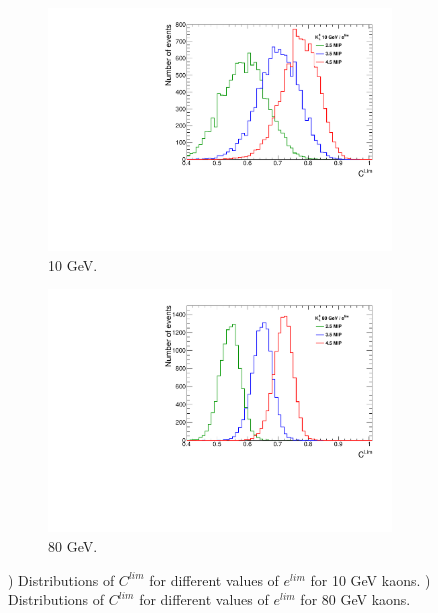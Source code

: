 \begin{figure}[htbp!]
  \centering
  \begin{subfigure}[t]{0.45\textwidth}
    \centering
    \includegraphics[width=1\linewidth]{../Thesis_Plots/ILD/AdditionalPlots/Plots/CLim_100ns_10GeV.pdf}
    \caption{10 GeV.} \label{fig:CLim10_100ns}
  \end{subfigure}
  \hfill
  \begin{subfigure}[t]{0.45\textwidth}
    \centering
    \includegraphics[width=1\linewidth]{../Thesis_Plots/ILD/AdditionalPlots/Plots/CLim_100ns_80GeV.pdf}
    \caption{80 GeV.} \label{fig:CLim80_100ns}
  \end{subfigure}
  \caption{) Distributions of $C^{lim}$ for different values of $e^{lim}$ for 10 GeV kaons. ) Distributions of $C^{lim}$ for different values of $e^{lim}$ for 80 GeV kaons.}
\end{figure}

